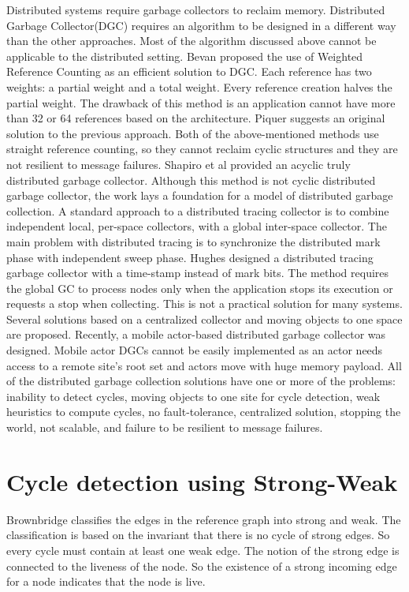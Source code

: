 Distributed systems require garbage collectors to reclaim memory. Distributed Garbage Collector(DGC) requires an algorithm to be designed in a different way than the other approaches. Most of the algorithm discussed above cannot be applicable to the distributed setting. Bevan\cite{Bevan87} proposed the use of Weighted Reference Counting as an efficient solution to DGC. Each reference has two weights: a partial weight and a total weight. Every reference creation halves the partial weight. The drawback of this method is an application cannot have more than 32 or 64 references based on the architecture. Piquer\cite{piquer91} suggests an original solution to the previous approach. Both of the above-mentioned methods use straight reference counting, so they cannot reclaim cyclic structures and they are not resilient to message failures. Shapiro et al \cite{Shapiro92} provided an acyclic truly distributed garbage collector. Although this method is not cyclic distributed garbage collector, the work lays a foundation for a model of distributed garbage collection. A standard approach to a distributed tracing collector is to combine independent local, per-space collectors, with a global inter-space collector. The main problem with distributed tracing is to synchronize the distributed mark phase with independent sweep phase\cite{plain95}. Hughes designed a distributed tracing garbage collector with a time-stamp instead of mark bits\cite{hugh85}. The method requires the global GC to process nodes only when the application stops its execution or requests a stop when collecting. This is not a practical solution for many systems. Several solutions based on a centralized collector and moving objects to one space are proposed\cite{Maheshwari1997,Maheshwari1997b,Liskov,Ladin,Veiga05}. Recently, a mobile actor-based distributed garbage collector was designed\cite{Wang2006}. Mobile actor DGCs cannot be easily implemented as an actor needs access to a remote site's root set and actors move with huge memory payload.  All of the distributed garbage collection solutions have one or more of the problems: inability to detect cycles, moving objects to one site for cycle detection, weak heuristics to compute cycles, no fault-tolerance, centralized solution, stopping the world, not scalable, and failure to be resilient to message failures.


\section{Cycle detection using Strong-Weak}
Brownbridge classifies the edges in the reference graph into strong and weak. The classification is based on the invariant that there is no cycle of strong edges. So every cycle must contain at least one weak edge. The notion of the strong edge is connected to the liveness of the node. So  the existence of a strong incoming edge for a node indicates that the node is live. 

